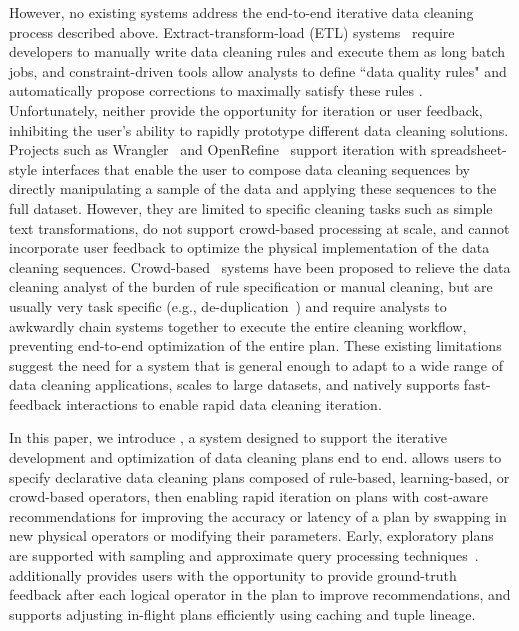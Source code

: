 However, no existing systems address the end-to-end iterative data cleaning process described above.
Extract-transform-load (ETL) systems~\cite{informatica,talend,apachefalcon} require developers to manually write data cleaning rules and execute them as long batch jobs, 
and constraint-driven tools allow analysts to define ``data quality rules" and automatically propose corrections to maximally satisfy these rules \cite{DBLP:conf/sigmod/DallachiesaEEEIOT13}.
Unfortunately, neither provide the opportunity for iteration or user feedback, inhibiting the user's ability to rapidly prototype different data cleaning solutions.
Projects such as Wrangler~\cite{wrangler,trifacta} and OpenRefine~\cite{openrefine} support iteration with spreadsheet-style interfaces that enable the user to compose data cleaning sequences by directly manipulating a sample of the data and applying these sequences to the full dataset.
However, they are limited to specific cleaning tasks such as simple text transformations, do not support crowd-based processing at scale, and cannot incorporate user feedback to optimize the physical implementation of the data cleaning sequences.
Crowd-based~\cite{gokhale2014corleone,stonebraker2013data} systems have been proposed to relieve the data cleaning analyst of the burden of rule specification or manual cleaning, but are usually very task specific (e.g., de-duplication~\cite{gokhale2014corleone,park2014crowdfill,eracer,chen2014integrating}) and require analysts to awkwardly chain systems together to execute the entire cleaning workflow, preventing end-to-end optimization of the entire plan.
These existing limitations suggest the need for a system that is general enough to adapt to a wide range of data cleaning applications, scales to large datasets, and natively supports fast-feedback interactions to enable rapid data cleaning iteration.

In this paper, we introduce \sys, a system designed to support the iterative development and optimization of data cleaning plans end to end.
\sys allows users to specify declarative data cleaning plans composed of rule-based, learning-based, or crowd-based operators, then enabling rapid iteration on plans with cost-aware recommendations for improving the accuracy or latency of a plan by swapping in new physical operators or modifying their parameters.
Early, exploratory plans are supported with sampling and approximate query processing techniques~\cite{wang1999sample}.
\sys additionally provides users with the opportunity to provide ground-truth feedback after each logical operator in the plan to improve recommendations, and supports adjusting in-flight plans efficiently using caching and tuple lineage.

